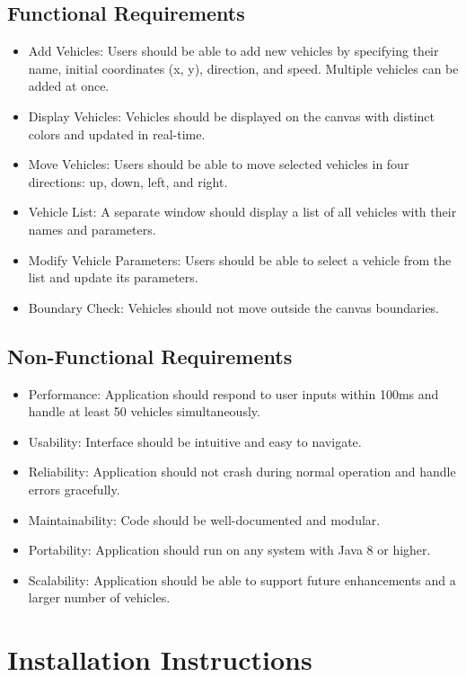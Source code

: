 \documentclass{article}
\begin{document}
\subsection{Functional Requirements}

\begin{itemize}
    \item Add Vehicles: Users should be able to add new vehicles by specifying their name, initial coordinates (x, y), direction, and speed. Multiple vehicles can be added at once.
    \item Display Vehicles: Vehicles should be displayed on the canvas with distinct colors and updated in real-time.
    \item Move Vehicles: Users should be able to move selected vehicles in four directions: up, down, left, and right.
    \item Vehicle List: A separate window should display a list of all vehicles with their names and parameters.
    \item Modify Vehicle Parameters: Users should be able to select a vehicle from the list and update its parameters.
    \item Boundary Check: Vehicles should not move outside the canvas boundaries.
\end{itemize}

\subsection{Non-Functional Requirements}

\begin{itemize}
    \item Performance: Application should respond to user inputs within 100ms and handle at least 50 vehicles simultaneously.
    \item Usability: Interface should be intuitive and easy to navigate.
    \item Reliability: Application should not crash during normal operation and handle errors gracefully.
    \item Maintainability: Code should be well-documented and modular.
    \item Portability: Application should run on any system with Java 8 or higher.
    \item Scalability: Application should be able to support future enhancements and a larger number of vehicles.
\end{itemize}

\section{Installation Instructions}
\end{document}
